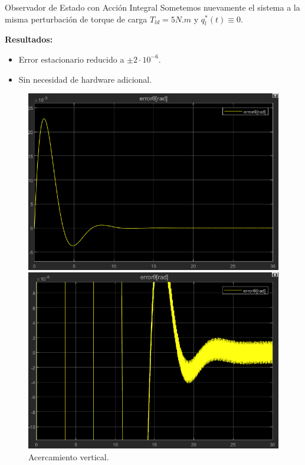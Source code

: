\documentclass[12pt]{beamer}
\begin{document}
\begin{frame}{Observador de Estado con Acción Integral}
Sometemos nuevamente el sistema a la misma perturbación de torque de carga $T_{ld} = 5 N.m$ y \(q_l^*(t) \equiv 0\).\

\textbf{Resultados:}
\begin{itemize}
    \item Error estacionario reducido a \( \pm 2 \cdot 10^{-6} \).
    \item Sin necesidad de hardware adicional.
\end{itemize}

\begin{figure}
        \centering
        \begin{minipage}{0.48\textwidth}
            \centering
            \includegraphics[width=\textwidth]{Imagenes/ErrorPosicionPerturbacionPID.png}
            \caption{Error de posición \(\theta^*(t)-\theta_m(t)\).}
            \label{fig:ErrorPosicionPerturbacionPID}
        \end{minipage}
        \hfill
        \begin{minipage}{0.48\textwidth}
            \centering
            \includegraphics[width=\textwidth]{Imagenes/AcercamientoErrorPosicionPerturbacionPID.png}\caption{Acercamiento vertical.}
            \label{fig:AcercamientoErrorPosicionPerturbacionPID}
        \end{minipage}
    \end{figure}
\end{frame}
\end{document}
